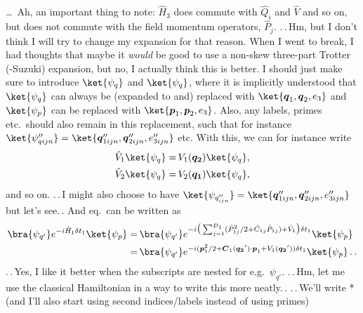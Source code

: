 \documentclass{report}
\begin{document}
\ldots\ Ah, an important thing to note: $\hat H_3$ does commute with $\hat Q_i$ and $\hat V$ and so on, but does not commute with the field momentum operators, $\hat P_j$. .\,.\,Hm, but I don't think I will try to change my expansion for that reason. When I went to break, I had thoughts that maybe it \emph{would} be good to use a non-skew three-part Trotter (-Suzuki) expansion, but no, I actually think this is better. I should just make sure to introduce $\ket{\psi_q}$ and $\ket{\psi_q}$, where it is implicitly understood that $\ket{\psi_q}$ can always be (expanded to and) replaced with $\ket{\boldsymbol{q}_1, \boldsymbol{q}_2, e_3}$ and $\ket{\psi_p}$ can be replaced with $\ket{\boldsymbol{p}_1, \boldsymbol{p}_2, e_3}$. Also, any labels, primes etc.\ should also remain in this replacement, such that for instance  $\ket{\psi_{q ijn}''} = \ket{\boldsymbol{q}_{1 ijn}'', \boldsymbol{q}_{2 ijn}'', e_{3 ijn}''}$ etc. With this, we can for instance write
\begin{align}
\begin{aligned}
	\hat V_{1} \ket{\psi_q} =&\,
		V_{1}(\boldsymbol{q_2})
		\ket{\psi_q}, \\
	\hat V_{2} \ket{\psi_q} =&\,
		V_{2}(\boldsymbol{q_1})
		\ket{\psi_q},
\end{aligned}
\end{align}
and so on. .\,.\,I might also choose to have $\ket{\psi_{q_{ijn}''}} = \ket{\boldsymbol{q}_{1 ijn}'', \boldsymbol{q}_{2 ijn}'', e_{3 ijn}''}$ but let's see.\,. And eq.\ can be written as
\begin{align}
\begin{aligned}
	\bra{\psi_{q'}} 
		e^{-i  \hat H_{1} \delta t_1 } 
	\ket{\psi_p}
	=&\,
	\bra{\psi_{q'}}  
		e^{
			-i
			\big(
				\sum_{j=1}^{D_1} (
					\hat P_{1j}^2 / 2 + 
					\hat C_{1j} \hat P_{1j}
				) +
				\hat V_1
			\big)
			\delta t_1
		} 
	\ket{\psi_p} 
	\\=&\,
	\bra{\psi_{q'}}  
		e^{
			-i
			(
				\boldsymbol p_{1}^2 / 2 + 
				\boldsymbol C_{1}(\boldsymbol{q_2}') \cdot \boldsymbol p_{1} +
				V_1(\boldsymbol{q_2}')
			)
			\delta t_1
		} 
	\ket{\psi_p} \,.\,.
\end{aligned}
\end{align}
.\,.\,Yes, I like it better when the subscripts are nested for e.g.\ $\psi_{q'}$.
.\,.\,Hm, let me use the classical Hamiltonian in a way to write this more neatly.\,. .\,.\,We'll write *(and I'll also start using second indices/labels instead of using primes)
\end{document}
